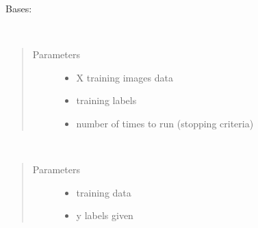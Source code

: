 \documentclass[letterpaper,10pt,english]{sphinxmanual}
\begin{document}
\begin{fulllineitems}
\label{\detokenize{classifiers:classifiers.logistic_regression.LogisticRegression}}
Bases: 

\begin{fulllineitems}
\label{\detokenize{classifiers:classifiers.logistic_regression.LogisticRegression.fit}}~\begin{quote}\begin{description}
\item[{Parameters}] \leavevmode\begin{itemize}
\item {} 
 \textendash{} X training images data

\item {} 
 \textendash{} training labels

\item {} 
 \textendash{} number of times to run (stopping criteria)

\end{itemize}

\end{description}\end{quote}

\end{fulllineitems}


\begin{fulllineitems}
\label{\detokenize{classifiers:classifiers.logistic_regression.LogisticRegression.gradient_decent}}~\begin{quote}\begin{description}
\item[{Parameters}] \leavevmode\begin{itemize}
\item {} 
 \textendash{} training data

\item {} 
 \textendash{} y labels given


\end{itemize}
\end{description}
\end{quote}
\end{fulllineitems}
\end{fulllineitems}
\end{document}
